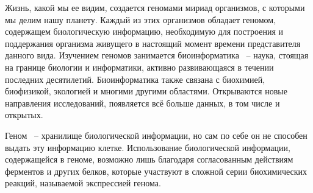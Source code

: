 \documentclass[times,specification,annotation]{itmo-student-thesis}
\begin{document}





\tableofcontents

\startprefacepage

Жизнь, какой мы ее видим, создается геномами мириад организмов, с которыми мы делим нашу планету. Каждый из этих организмов обладает геномом, содержащем биологическую информацию, необходимую для построения и поддержания организма живущего в настоящий момент времени представителя данного вида.\cite{Introduction} Изучением геномов занимается биоинформатика ~-- наука, стоящая на границе биологии и информатики, активно развивающаяся в течении последних десятилетий. Биоинформатика также связана с биохимией, биофизикой, экологией и многими другими областями. Открываются новые направления исследований, появляется всё больше данных, в том числе и открытых.

Геном ~-- хранилище биологической информации, но сам по себе он не способен выдать эту информацию клетке. Использование биологической информации, содержащейся в геноме, возможно лишь благодаря согласованным действиям ферментов и других белков, которые участвуют в сложной серии биохимических реакций, называемой экспрессией генома.\cite{Introduction}
\end{document}
